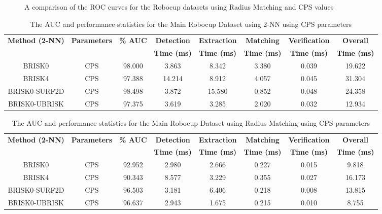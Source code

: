 \begin{figure}[ht!]
\begin{minipage}[b]{0.5\linewidth}
\caption{A comparison of the ROC curves for the Robocup datasets using Radius Matching and CPS values}
\label{fig:compareHammingConsistent}
\end{minipage}
\end{figure}


\begin{table}
\centering

\caption{The AUC and performance statistics for the Main Robocup Dataset using
2-NN using CPS parameters}


\begin{tabular}{|c|c|c|c|c|c|c|c|}
\hline 
\textbf{Method (2-NN)} & \textbf{Parameters} & \textbf{\% AUC} & \textbf{Detection} & \textbf{Extraction} & \textbf{Matching} & \textbf{Verification} & \textbf{Overall}\tabularnewline
 &  &  & \textbf{Time (ms)} & \textbf{Time (ms)} & \textbf{Time (ms)} & \textbf{Time (ms)} & \textbf{Time (ms)}\tabularnewline
\hline 
\hline 
BRISK0 & CPS & 98.000 & 3.863 & 8.342 & 3.380 & 0.039 & 19.622\tabularnewline
\hline 
BRISK4 & CPS & 97.388 & 14.214 & 8.912 & 4.057 & 0.045 & 31.304\tabularnewline
\hline 
BRISK0-SURF2D & CPS & 98.498 & 3.872 & 15.580 & 0.852 & 0.048 & 24.358\tabularnewline
\hline 
BRISK0-UBRISK & CPS & 97.375 & 3.619 & 3.285 & 2.020 & 0.032 & 12.934\tabularnewline
\hline 
\end{tabular}
\label{app:mrd_knn}
\end{table}



\begin{table}
\centering
\caption{The AUC and performance statistics for the Main Robocup Dataset using
Radius Matching using CPS parameters}


\begin{tabular}{|c|c|c|c|c|c|c|c|}
\hline 
\textbf{Method (2-NN)} & \textbf{Parameters} & \textbf{\% AUC} & \textbf{Detection} & \textbf{Extraction} & \textbf{Matching} & \textbf{Verification} & \textbf{Overall}\tabularnewline
 &  &  & \textbf{Time (ms)} & \textbf{Time (ms)} & \textbf{Time (ms)} & \textbf{Time (ms)} & \textbf{Time (ms)}\tabularnewline
\hline 
\hline 
BRISK0 & CPS & 92.952 & 2.980 & 2.666 & 0.227 & 0.015 & 9.818\tabularnewline
\hline 
BRISK4 & CPS & 90.343 & 8.577 & 3.229 & 0.355 & 0.027 & 16.173\tabularnewline
\hline 
BRISK0-SURF2D & CPS & 96.503 & 3.181 & 6.406 & 0.218 & 0.008 & 13.815\tabularnewline
\hline 
BRISK0-UBRISK & CPS & 96.637 & 2.943 & 1.675 & 0.215 & 0.010 & 8.755\tabularnewline
\hline 
\end{tabular}
\label{app:mrd_hamming}
\end{table}

